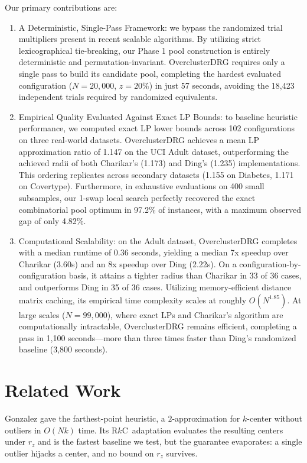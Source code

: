 \documentclass[twoside,leqno,twocolumn]{article}
\newcommand{\rz}{r_z}
\newcommand{\rkc}{R$k$C}
\begin{document}
Our primary contributions are:
\begin{enumerate}
    \item A Deterministic, Single-Pass Framework: we bypass the randomized trial multipliers present in recent scalable algorithms. By utilizing strict lexicographical tie-breaking, our Phase 1 pool construction is entirely deterministic and permutation-invariant. OverclusterDRG requires only a single pass to build its candidate pool, completing the hardest evaluated configuration ($N=20,000$, $z=20\%$) in just 57 seconds, avoiding the 18,423 independent trials required by randomized equivalents.

    \item Empirical Quality Evaluated Against Exact LP Bounds: to baseline heuristic performance, we computed exact LP lower bounds across 102 configurations on three real-world datasets. OverclusterDRG achieves a mean LP approximation ratio of 1.147 on the UCI Adult dataset, outperforming the achieved radii of both Charikar's (1.173) and Ding's (1.235) implementations. This ordering replicates across secondary datasets (1.155 on Diabetes, 1.171 on Covertype). Furthermore, in exhaustive evaluations on 400 small subsamples, our 1-swap local search perfectly recovered the exact combinatorial pool optimum in 97.2\% of instances, with a maximum observed gap of only 4.82\%.
\item  Computational Scalability: on the Adult dataset, OverclusterDRG completes with a median runtime of 0.36 seconds, yielding a median 7x speedup over Charikar (3.60s) and an 8x speedup over Ding (2.22s). On a configuration-by-configuration basis, it attains a tighter radius than Charikar in 33 of 36 cases, and outperforms Ding in 35 of 36 cases. Utilizing memory-efficient distance matrix caching, its empirical time complexity scales at roughly $O(N^{1.85})$. At large scales ($N = 99,000$), where exact LPs and Charikar's algorithm are computationally intractable, OverclusterDRG remains efficient, completing a pass in 1,100 seconds---more than three times faster than Ding's randomized baseline (3,800 seconds).
\end{enumerate}

\section{Related Work}

Gonzalez \cite{gonzalez1985} gave the farthest-point heuristic, a
$2$-approximation for $k$-center without outliers in $O(Nk)$ time. Its
\rkc~adaptation evaluates the resulting centers under $\rz$ and is the
fastest baseline we test, but the guarantee evaporates: a single
outlier hijacks a center, and no bound on $\rz$ survives.
\end{document}
